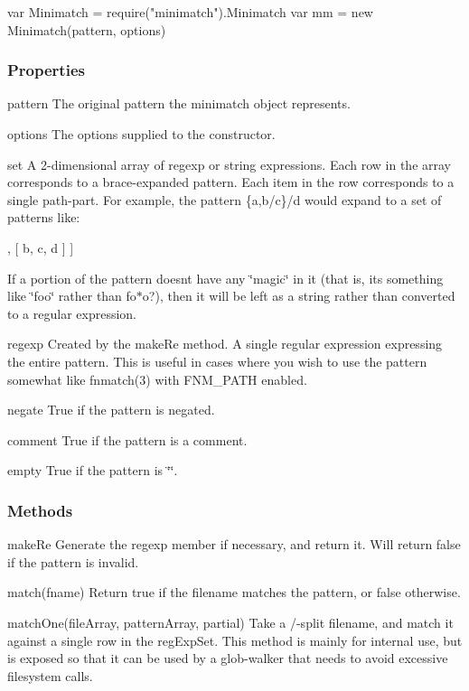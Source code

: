 \begin{DoxyCode}
var Minimatch = require("minimatch").Minimatch
var mm = new Minimatch(pattern, options)
\end{DoxyCode}


\subsubsection*{Properties}


\begin{DoxyItemize}
\item {\ttfamily pattern} The original pattern the minimatch object represents.
\item {\ttfamily options} The options supplied to the constructor.
\item {\ttfamily set} A 2-\/dimensional array of regexp or string expressions. Each row in the array corresponds to a brace-\/expanded pattern. Each item in the row corresponds to a single path-\/part. For example, the pattern {\ttfamily \{a,b/c\}/d} would expand to a set of patterns like\+: \begin{DoxyVerb}  [ [ a, d ]
  , [ b, c, d ] ]
\end{DoxyVerb}


If a portion of the pattern doesn\textquotesingle{}t have any \char`\"{}magic\char`\"{} in it (that is, it\textquotesingle{}s something like {\ttfamily \char`\"{}foo\char`\"{}} rather than {\ttfamily fo$\ast$o?}), then it will be left as a string rather than converted to a regular expression.
\item {\ttfamily regexp} Created by the {\ttfamily make\+Re} method. A single regular expression expressing the entire pattern. This is useful in cases where you wish to use the pattern somewhat like {\ttfamily fnmatch(3)} with {\ttfamily F\+N\+M\+\_\+\+P\+A\+TH} enabled.
\item {\ttfamily negate} True if the pattern is negated.
\item {\ttfamily comment} True if the pattern is a comment.
\item {\ttfamily empty} True if the pattern is {\ttfamily \char`\"{}\char`\"{}}.
\end{DoxyItemize}

\subsubsection*{Methods}


\begin{DoxyItemize}
\item {\ttfamily make\+Re} Generate the {\ttfamily regexp} member if necessary, and return it. Will return {\ttfamily false} if the pattern is invalid.
\item {\ttfamily match(fname)} Return true if the filename matches the pattern, or false otherwise.
\item {\ttfamily match\+One(file\+Array, pattern\+Array, partial)} Take a {\ttfamily /}-\/split filename, and match it against a single row in the {\ttfamily reg\+Exp\+Set}. This method is mainly for internal use, but is exposed so that it can be used by a glob-\/walker that needs to avoid excessive filesystem calls.
\end{DoxyItemize}

